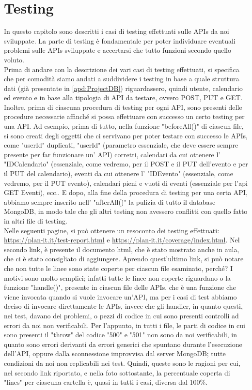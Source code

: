 \section{Testing}
\label{secD4:Testing}

In questo capitolo sono descritti i casi di testing effettuati sulle APIs da noi sviluppate. La parte di testing è fondamentale per poter individuare eventuali problemi sulle APIs sviluppate e accertarsi che tutto funzioni secondo quello voluto.\\
Prima di andare con la descrizione dei vari casi di testing effettuati, si specifica che per comodità siamo andati a suddividere i testing in base a quale struttura dati (già presentate in \ref{apd:ProjectDB}) riguardassero, quindi utente, calendario ed evento e in base alla tipologia di API da testare, ovvero POST, PUT e GET. Inoltre, prima di ciascuna procedura di testing per ogni API, sono presenti delle procedure necessarie affinché si possa effettuare con successo un certo testing per una API. Ad esempio, prima di tutto, nella funzione "beforeAll()" di ciascun file, si sono creati degli oggetti che ci servivano per poter testare con successo le APIs, come "userId" duplicati, "userId" (parametro essenziale, che deve essere sempre presente per far funzionare un' API) corretti, calendari da cui ottenere l' "IDCalendario" (essenziale, come vedremo, per il POST e il PUT dell'evento e per il PUT del calendario), eventi da cui ottenere l' "IDEvento" (essenziale, come vedremo, per il PUT evento), calendari pieni e vuoti di eventi (essenziale per l'api GET Eventi), ecc.. E dopo, alla fine della procedura di testing per una certa API, abbiamo sempre inserito nell' "afterAll()" la pulizia di tutto il database MongoDB, in modo tale che gli altri testing non avessero conflitti con quello fatto in altri file di testing. \\ Nelle seguenti pagine, si può ottenere un resoconto dei testing effettuati: \url{https://plan-it.it/test-report.html} e \url{https://plan-it.it/coverage/index.html}. Nel secondo link, è presente il documento html, che è stato mostrato anche in aula, che ci è stato consigliato di aggiungere. Aprendo quest'ultimo link, si può notare che non tutte le linee sono state coperte per ciascun file esaminato, perché? I motivi sono molto semplici; infatti tutte le linee non coperte riguardano o la funzione "handle()", presente in ciascun file delle APIs, che è una funzione che viene invocata quando si vuole invocare un'API, ma per i casi di test abbiamo deciso di invocare direttamente le APIs, invece che gli handler, in quanto questi, nei test, davano dei problemi, o pezzi di codice in cui sono presenti controlli ad errori da noi non verificabili. Per l'appunto, in tutti i file, le parti di codice in cui sono presenti il "throw" del codice "500" e "501" non sono da noi verificabili, in quanto sono errori derivanti da errori generici che spuntano durante l'esecuzione dell'API, oppure dalla sconnessione improvvisa dal server MongoDB; tutte condizioni da noi non replicabili nei test. Quindi, queste sono le ragioni per cui, nel secondo link riportato, e nella foto sottostante, la percentuale coperta di "lines" per ciascuna cartella è, quasi in tutti i casi, diversa dal 100\%.

